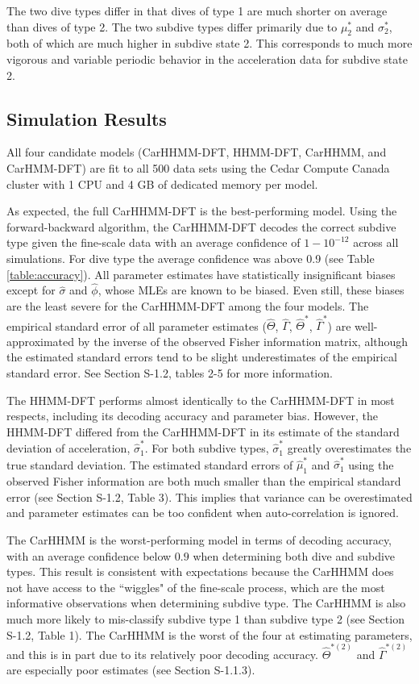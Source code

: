 The two dive types differ in that dives of type 1 are much shorter on average than dives of type 2. The two subdive types differ primarily due to $\mu_2^*$ and $\sigma_2^*$, both of which are much higher in subdive state 2. This corresponds to much more vigorous and variable periodic behavior in the acceleration data for subdive state 2.

\subsection{Simulation Results}

All four candidate models (CarHHMM-DFT, HHMM-DFT, CarHHMM, and CarHMM-DFT) are fit to all 500 data sets using the Cedar Compute Canada cluster with 1 CPU and 4 GB of dedicated memory per model.

As expected, the full CarHHMM-DFT is the best-performing model. Using the forward-backward algorithm, the CarHHMM-DFT decodes the correct subdive type given the fine-scale data with an average confidence of $1 - 10^{-12}$ across all simulations. For dive type the average confidence was above 0.9 (see Table \ref{table:accuracy}). All parameter estimates have statistically insignificant biases except for $\hat \sigma$ and $\hat \phi$, whose MLEs are known to be biased. Even still, these biases are the least severe for the CarHHMM-DFT among the four models. The empirical standard error of all parameter estimates ($\hat \Theta$, $\hat \Gamma$, $\hat \Theta^*$, $\hat \Gamma^*$) are well-approximated by the inverse of the observed Fisher information matrix, although the estimated standard errors tend to be slight underestimates of the empirical standard error. See Section S-1.2, tables 2-5 for more information.

The HHMM-DFT performs almost identically to the CarHHMM-DFT in most respects, including its decoding accuracy and parameter bias. However, the HHMM-DFT differed from the CarHHMM-DFT in its estimate of the standard deviation of acceleration, $\hat \sigma_1^*$. For both subdive types, $\hat \sigma_1^*$ greatly overestimates the true standard deviation. The estimated standard errors of $\hat \mu_1^*$ and $\hat \sigma_1^*$ using the observed Fisher information are both much smaller than the empirical standard error (see Section S-1.2, Table 3). This implies that variance can be overestimated and parameter estimates can be too confident when auto-correlation is ignored.

The CarHHMM is the worst-performing model in terms of decoding accuracy, with an average confidence below $0.9$ when determining both dive and subdive types. This result is consistent with expectations because the CarHHMM does not have access to the ``wiggles" of the fine-scale process, which are the most informative observations when determining subdive type. The CarHHMM is also much more likely to mis-classify subdive type 1 than subdive type 2 (see Section S-1.2, Table 1). The CarHHMM is the worst of the four at estimating parameters, and this is in part due to its relatively poor decoding accuracy. $\hat \Theta^{*(2)}$ and $\hat \Gamma^{*(2)}$ are especially poor estimates (see Section S-1.1.3).

